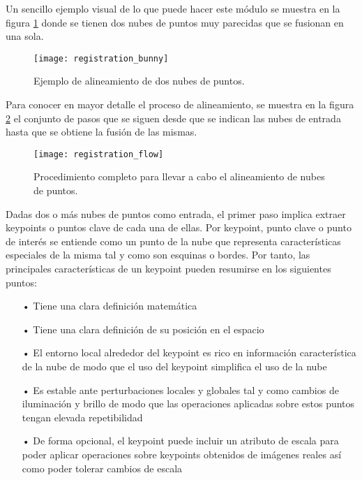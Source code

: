 Un sencillo ejemplo visual de lo que puede hacer este módulo se muestra en la figura \ref{fig:registration_bunny} donde se tienen dos nubes de puntos muy parecidas que se fusionan en una sola. 


\begin{figure}
\centering
\texttt{[image: registration\_bunny]}
\caption{Ejemplo de alineamiento de dos nubes de puntos.}\label{fig:registration_bunny}
\end{figure}


Para conocer en mayor detalle el proceso de alineamiento, se muestra en la figura \ref{fig:registration_flow} el conjunto de pasos que se siguen desde que se indican las nubes de entrada hasta que se obtiene la fusión de las mismas.
\begin{figure}
\centering
\texttt{[image: registration\_flow]}
\caption{Procedimiento completo para llevar a cabo el alineamiento de nubes de puntos.}\label{fig:registration_flow}
\end{figure}


Dadas dos o más nubes de puntos como entrada, el primer paso implica extraer keypoints o puntos clave de cada una de ellas. Por keypoint, punto clave o punto de interés se entiende como un punto de la nube que representa características especiales de la misma tal y como son esquinas o bordes. Por tanto, las principales características de un keypoint pueden resumirse en los siguientes puntos:


\begin{itemize}
\item[•] Tiene una clara definición matemática
\item[•] Tiene una clara definición de su posición en el espacio
\item[•] El entorno local alrededor del keypoint es rico en información característica de la nube de modo que el uso del keypoint simplifica el uso de la nube
\item[•] Es estable ante perturbaciones locales y globales tal y como cambios de iluminación y brillo de modo que las operaciones aplicadas sobre estos puntos tengan elevada repetibilidad
\item[•] De forma opcional, el keypoint puede incluir un atributo de escala para poder aplicar operaciones sobre keypoints obtenidos de imágenes reales así como poder tolerar cambios de escala
\end{itemize}


